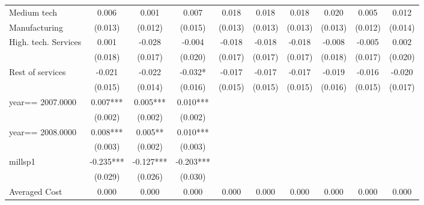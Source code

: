 \begin{table}[htbp]
\begin{tabular}{l*{9}{c}}
Medium tech         &       0.006   &       0.001   &       0.007   &       0.018   &       0.018   &       0.018   &       0.020   &       0.005   &       0.012   \\
Manufacturing       &     (0.013)   &     (0.012)   &     (0.015)   &     (0.013)   &     (0.013)   &     (0.013)   &     (0.013)   &     (0.012)   &     (0.014)   \\
High. tech. Services&       0.001   &      -0.028   &      -0.004   &      -0.018   &      -0.018   &      -0.018   &      -0.008   &      -0.005   &       0.002   \\
                    &     (0.018)   &     (0.017)   &     (0.020)   &     (0.017)   &     (0.017)   &     (0.017)   &     (0.018)   &     (0.017)   &     (0.020)   \\
Rest of services    &      -0.021   &      -0.022   &      -0.032*  &      -0.017   &      -0.017   &      -0.017   &      -0.019   &      -0.016   &      -0.020   \\
                    &     (0.015)   &     (0.014)   &     (0.016)   &     (0.015)   &     (0.015)   &     (0.015)   &     (0.016)   &     (0.015)   &     (0.017)   \\
year==  2007.0000   &       0.007***&       0.005***&       0.010***&               &               &               &               &               &               \\
                    &     (0.002)   &     (0.002)   &     (0.002)   &               &               &               &               &               &               \\
year==  2008.0000   &       0.008***&       0.005** &       0.010***&               &               &               &               &               &               \\
                    &     (0.003)   &     (0.002)   &     (0.003)   &               &               &               &               &               &               \\
millsp1             &      -0.235***&      -0.127***&      -0.203***&               &               &               &               &               &               \\
                    &     (0.029)   &     (0.026)   &     (0.030)   &               &               &               &               &               &               \\
Averaged Cost       &       0.000   &       0.000   &       0.000   &       0.000   &       0.000   &       0.000   &       0.000   &       0.000   &       0.000   \\

\end{tabular}
\end{table}
